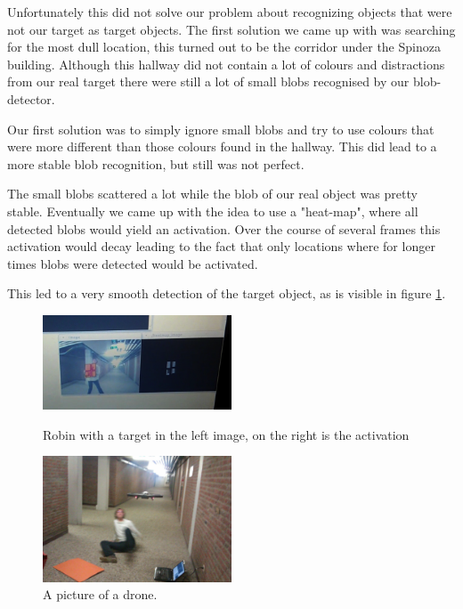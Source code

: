 \documentclass[a4paper,10pt]{article}
\begin{document}
Unfortunately this did not solve our problem about recognizing objects that were not our target as target objects.
The first solution we came up with was searching for the most dull location, this turned out to be the corridor under the Spinoza building. 
Although this hallway did not contain a lot of colours and distractions from our real target there were still a lot of small blobs recognised by our blob-detector. 

Our first solution was to simply ignore small blobs and try to use colours that were more different than those colours found in the hallway. 
This did lead to a more stable blob recognition, but still was not perfect. 

The small blobs scattered a lot while the blob of our real object was pretty stable. 
Eventually we came up with the idea to use a "heat-map", where all detected blobs would yield an activation. 
Over the course of several frames this activation would decay leading to the fact that only locations where for longer times blobs were detected would be activated. 

This led to a very smooth detection of the target object, as is visible in figure \ref{fig:robinPresentActivation}. 

\begin{figure}[h!]
	\caption{Robin with a target in the left image, on the right is the activation}
	\centering
	\includegraphics[width=0.5\textwidth]{images/robinPresentActivation}
	\label{fig:robinPresentActivation}
\end{figure}

\begin{figure}[h!]
	\caption{A picture of a drone.}
	\centering
	\includegraphics[width=0.5\textwidth]{images/droneAttack}
\end{figure}
\end{document}
